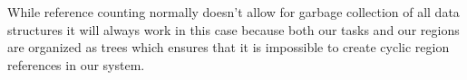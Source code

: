 


While reference counting normally doesn't allow for garbage collection of all data structures
it will always work in this case because both our tasks and our regions are organized as 
trees which ensures that it is impossible to create cyclic region references in our system.


